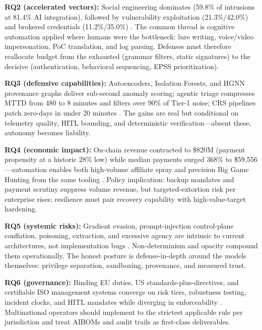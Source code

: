 \documentclass[conference,10pt,twocolumn,a4paper]{IEEEtran}
\begin{document}
\textbf{RQ2 (accelerated vectors):} Social engineering dominates (59.8\% of intrusions at 81.4\% AI integration), followed by vulnerability exploitation (21.3\%/42.0\%) and brokered credentials (11.2\%/35.0\%) \cite{enisa_etl_2025, fang2024teams, fbi_deepfakes_bec_2025}. The common thread is cognitive automation applied where humans were the bottleneck: lure writing, voice/video impersonation, PoC translation, and log parsing. Defenses must therefore reallocate budget from the exhausted (grammar filters, static signatures) to the decisive (authentication, behavioral sequencing, EPSS prioritization).

\textbf{RQ3 (defensive capabilities):} Autoencoders, Isolation Forests, and HGNN provenance graphs deliver sub-second anomaly scoring; agentic triage compresses MTTD from 480 to 8 minutes and filters over 90\% of Tier-1 noise; CRS pipelines patch zero-days in under 20 minutes \cite{cisa_agentic_ai_2026, mirsky2018kitsune, darpa_aixcc_2025}. The gains are real but conditional on telemetry quality, HITL bounding, and deterministic verification---absent these, autonomy becomes liability.

\textbf{RQ4 (economic impact):} On-chain revenue contracted to \$820M (payment propensity at a historic 28\% low) while median payments surged 368\% to \$59,556---automation enables both high-volume affiliate spray and precision Big Game Hunting from the same tooling \cite{chainalysis_crypto_crime_2026}. Policy implication: backup mandates and payment scrutiny suppress volume revenue, but targeted-extortion risk per enterprise rises; resilience must pair recovery capability with high-value-target hardening.

\textbf{RQ5 (systemic risks):} Gradient evasion, prompt-injection control-plane conflation, poisoning, extraction, and excessive agency are intrinsic to current architectures, not implementation bugs \cite{nist_sp_ai_100_2e2025, greshake2023indirect, carlini2017towards}. Non-determinism and opacity compound them operationally. The honest posture is defense-in-depth around the models themselves: privilege separation, sandboxing, provenance, and measured trust.

\textbf{RQ6 (governance):} Binding EU duties, US standards-plus-directives, and certifiable ISO management systems converge on risk tiers, robustness testing, incident clocks, and HITL mandates while diverging in enforceability \cite{eu_ai_act_2024, nist_csf_ai_2026, cisa_agentic_ai_2026}. Multinational operators should implement to the strictest applicable rule per jurisdiction and treat AIBOMs and audit trails as first-class deliverables.
\end{document}
